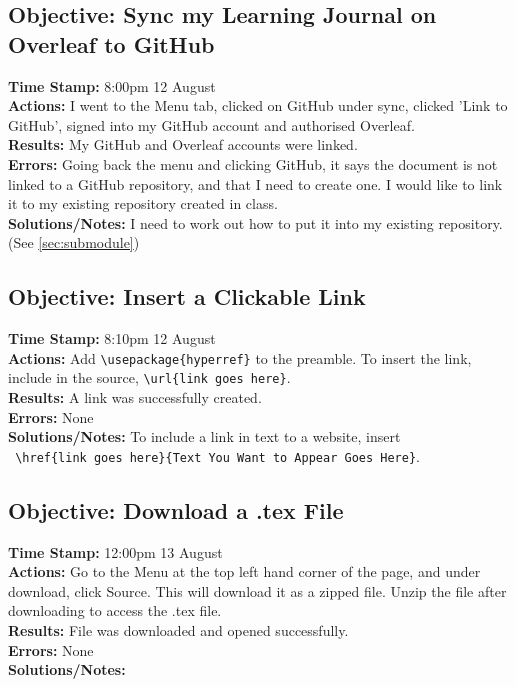 \documentclass{article}
\begin{document}
\begin{FlushLeft}
\subsection{Objective: Sync my Learning Journal on Overleaf to GitHub}
\textbf{Time Stamp:} 8:00pm 12 August\\
\textbf{Actions:} I went to the Menu tab, clicked on GitHub under sync, clicked 'Link to GitHub', signed into my GitHub account and authorised Overleaf.\\
\textbf{Results:} My GitHub and Overleaf accounts were linked.\\
\textbf{Errors:} Going back the menu and clicking GitHub, it says the document is not linked to a GitHub repository, and that I need to create one. I would like to link it to my existing repository created in class.\\ 
\textbf{Solutions/Notes:} I need to work out how to put it into my existing repository. (See \autoref{sec:submodule})

\subsection{Objective: Insert a Clickable Link}
\textbf{Time Stamp:} 8:10pm 12 August\\
\textbf{Actions:} Add \verb|\usepackage{hyperref}| to the preamble. To insert the link, include in the source, \verb|\url{link goes here}|.\\
\textbf{Results:} A link was successfully created.\\
\textbf{Errors:} None\\
\textbf{Solutions/Notes:} To include a link in text to a website, insert \\
\verb| \href{link goes here}{Text You Want to Appear Goes Here}|.

\subsection{Objective: Download a .tex File}
\textbf{Time Stamp:} 12:00pm 13 August\\
\textbf{Actions:} Go to the Menu at the top left hand corner of the page, and under download, click Source. This will download it as a zipped file. Unzip the file after downloading to access the .tex file.\\
\textbf{Results:} File was downloaded and opened successfully.\\
\textbf{Errors:} None\\
\textbf{Solutions/Notes:}


\end{FlushLeft}
\end{document}

